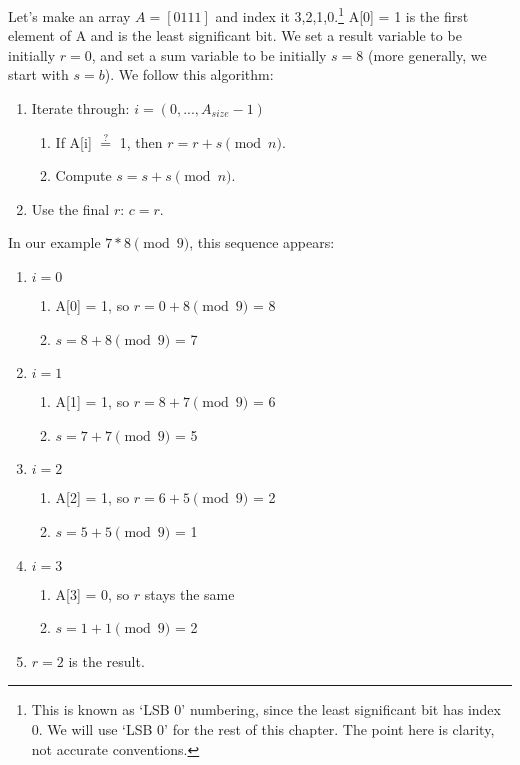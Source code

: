 Let's make an array $A = [0111]$ and index it 3,2,1,0.\footnote{This is known as `LSB 0' numbering, since the least significant bit has index 0. We will use `LSB 0' for the rest of this chapter. The point here is clarity, not accurate conventions.} A[0] = 1 is the first element of A and is the least significant bit. We set a result variable to be initially $r = 0$, and set a sum variable to be initially $s = 8$ (more generally, we start with $s = b$). We follow this algorithm:
\begin{enumerate}
	\item Iterate through: $i = (0,...,A_{size} - 1)$
	\begin{enumerate}
		\item If A[i] $\stackrel{?}{=}$ 1, then $r = r + s \pmod n$.
		\item Compute $s = s + s \pmod n$.
	\end{enumerate}
	\item Use the final $r$: $c = r$.
\end{enumerate}

In our example $7*8 \pmod 9$, this sequence appears:
\begin{enumerate}
	\item $i = 0$
	\begin{enumerate}
		\item A[0] = 1, so $r = 0 + 8 \pmod 9$ = 8
		\item $s = 8 + 8 \pmod 9$ = 7
	\end{enumerate}
	\item $i = 1$
	\begin{enumerate}
		\item A[1] = 1, so $r = 8 + 7 \pmod 9$ = 6
		\item $s = 7 + 7 \pmod 9$ = 5
	\end{enumerate}
	\item $i = 2$
	\begin{enumerate}
		\item A[2] = 1, so $r = 6 + 5 \pmod 9$ = 2
		\item $s = 5 + 5 \pmod 9$ = 1
	\end{enumerate}
	\item $i = 3$
	\begin{enumerate}
		\item A[3] = 0, so $r$ stays the same
		\item $s = 1 + 1 \pmod 9$ = 2
	\end{enumerate}
	\item $r = 2$ is the result.
\end{enumerate}


